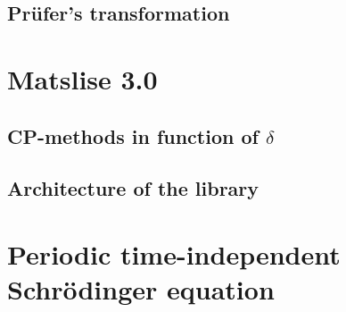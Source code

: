 
\subsection{Prüfer's transformation}

\section{Matslise 3.0}

\cite{baeyens_fast_2020}

\subsection{CP-methods in function of \texorpdfstring{$\delta$}{delta}}

\subsection{Architecture of the \texorpdfstring{\cpp}{C++} library}

\section{Periodic \texorpdfstring{\oneD}{1D} time-independent Schrödinger equation}
\label{sec:1d_periodic}

\begin{theorem}

\end{theorem}
\cite{binding_prufer_2012}

\stopchapter
